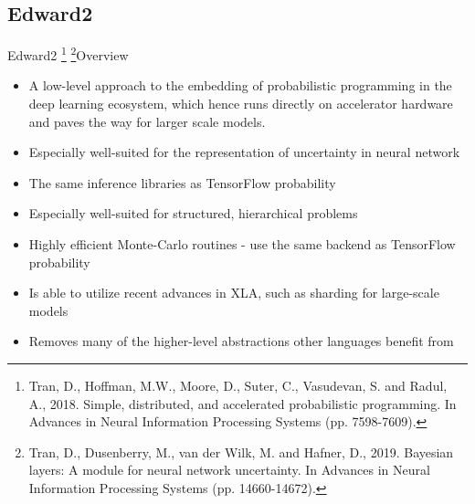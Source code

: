 \documentclass[AERbeamer%
              ,optEnglish%
              ,optBiber%
              ,optBibstyleAlphabetic%
              ,optBeamerClassicFormat%
              ]{AERlatex}%
\begin{document}
\subsection{Edward2}
\begin{frame}[c]{Edward2 \footnote{Tran, D., Hoffman, M.W., Moore, D., Suter, C., Vasudevan, S. and Radul, A., 2018. Simple, distributed,
                                   and accelerated probabilistic programming. In Advances in Neural Information Processing Systems (pp. 7598-7609).}
                         \footnote{Tran, D., Dusenberry, M., van der Wilk, M. and Hafner, D., 2019. Bayesian layers: A module for neural network
                                   uncertainty. In Advances in Neural Information Processing Systems (pp. 14660-14672).}}{Overview}
    \centering
    \begin{itemize}
        \item A low-level approach to the embedding of probabilistic programming in the deep learning ecosystem, which
              hence runs directly on accelerator hardware and paves the way for larger scale models.
        \item Especially well-suited for the representation of uncertainty in neural network
        \item The same inference libraries as TensorFlow probability
        \item Especially well-suited for structured, hierarchical problems
        \item Highly efficient Monte-Carlo routines - use the same backend as TensorFlow probability
        \item Is able to utilize recent advances in XLA, such as sharding for large-scale models
        \item Removes many of the higher-level abstractions other languages benefit from
    \end{itemize}
\end{frame}
\end{document}

